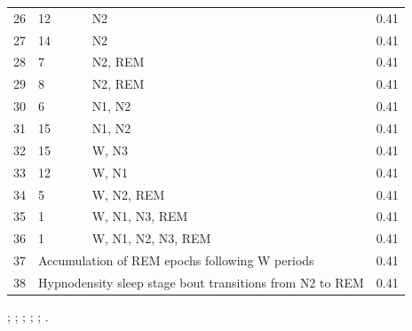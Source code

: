 \begin{table}
\begin{threeparttable}
\begin{tabular}{@{}lp{6cm}lr@{}}
        26 & 12                                                     & \ac{N2}                               & 0.41                         \\
        27 & 14                                                     & \ac{N2}                               & 0.41                         \\
        28 & 7                                                      & \ac{N2}, \ac{REM}                     & 0.41                         \\
        29 & 8                                                      & \ac{N2}, \ac{REM}                     & 0.41                         \\
        30 & 6                                                      & \ac{N1}, \ac{N2}                      & 0.41                         \\
        31 & 15                                                     & \ac{N1}, \ac{N2}                      & 0.41                         \\
        32 & 15                                                     & \ac{W}, \ac{N3}                       & 0.41                         \\
        33 & 12                                                     & \ac{W}, \ac{N1}                       & 0.41                         \\
        34 & 5                                                      & \ac{W}, \ac{N2}, \ac{REM}             & 0.41                         \\
        35 & 1                                                      & \ac{W}, \ac{N1}, \ac{N3}, \ac{REM}    & 0.41                         \\
        36 & 1                                                      & \ac{W}, \ac{N1}, \ac{N2}, \ac{N3}, \ac{REM}   & 0.41                 \\
        37 & \multicolumn{2}{l}{Accumulation of \ac{REM} epochs following \ac{W} periods}                   & 0.41                         \\
        38 & \multicolumn{2}{l}{Hypnodensity sleep stage bout transitions from \ac{N2} to \ac{REM}}         & 0.41                         \\ \bottomrule
    \end{tabular}
    \begin{tablenotes}
    \item %
    ; %
    ; %
    ; %
    ; %
    ; %
    .
    \end{tablenotes}
    \end{threeparttable}
\end{table}

